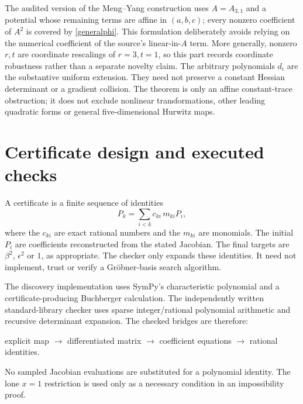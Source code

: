 \documentclass[11pt,a4paper]{article}
\theoremstyle{remark}\newtheorem{remark}[theorem]{Remark}
\begin{document}
The audited version of the Meng--Yang construction \cite{hessian} uses
$A=A_{3,1}$ and a potential whose remaining terms are affine in $(a,b,c)$;
every nonzero coefficient of $A^2$ is covered by \eqref{generalphi}.  This
formulation deliberately avoids relying on the numerical coefficient of the
source's linear-in-$A$ term.  More generally,
nonzero $r,t$ are coordinate rescalings of $r=3,t=1$, so this part records
coordinate robustness rather than a separate novelty claim.  The arbitrary
polynomials $d_i$ are the substantive uniform extension.  They need not preserve
a constant Hessian determinant or a gradient collision.  The theorem is only an
affine constant-trace obstruction; it does not exclude nonlinear transformations,
other leading quadratic forms or general five-dimensional Hurwitz maps.

\section{Certificate design and executed checks}
A certificate is a finite sequence of identities
\[
P_k=\sum_{i<k} c_{ki}\,m_{ki}P_i,
\]
where the $c_{ki}$ are exact rational numbers and the $m_{ki}$ are monomials.
The initial $P_i$ are coefficients reconstructed from the stated Jacobian.
The final targets are $\beta^2$, $\epsilon^2$ or $1$, as appropriate.
The checker only expands these identities. It need not implement, trust or
verify a Gr\"obner-basis search algorithm.

The discovery implementation uses SymPy's characteristic polynomial and a
certificate-producing Buchberger calculation. The independently written
standard-library checker uses sparse integer/rational polynomial arithmetic
and recursive determinant expansion. The checked bridges are therefore:
\begin{center}
explicit map $\longrightarrow$ differentiated matrix $\longrightarrow$
coefficient equations $\longrightarrow$ rational identities.
\end{center}
No sampled Jacobian evaluations are substituted for a polynomial identity.
The lone $x=1$ restriction is used only as a necessary condition in an
impossibility proof.
\end{document}
